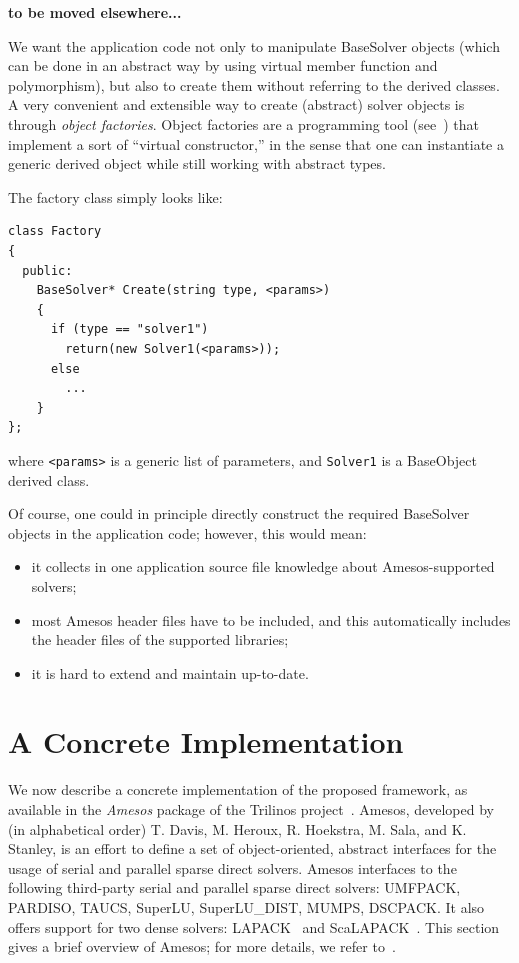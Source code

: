 \documentclass[acmtocl]{acmtrans2m}
\begin{document}
{\bf to be moved elsewhere...}

We want the application  code not only to manipulate BaseSolver objects 
(which can be done in an abstract way by using virtual member function and
 polymorphism), but also to create them without referring to the derived
classes. 
A very convenient and extensible way to create (abstract) solver objects is
through {\sl object factories}. Object factories are a programming
tool (see~\cite{alexandrescu04modern}) that implement a sort of ``virtual
constructor,'' in the sense that one can instantiate a generic derived object
while still working with abstract types.

The factory class simply looks like:
\begin{verbatim}
class Factory
{
  public:
    BaseSolver* Create(string type, <params>)
    {
      if (type == "solver1")
        return(new Solver1(<params>));
      else 
        ...
    }
};
\end{verbatim}
where \verb!<params>! is a generic list of parameters, and \verb!Solver1! is a
BaseObject derived class. 

Of course, one could in principle directly construct the required BaseSolver
objects in the application code; however, this would mean:
\begin{itemize}
\item it collects in one application source file knowledge about
Amesos-supported solvers;
\item most Amesos header files have to be included, and this automatically
includes the header files of the supported libraries;
\item it is hard to extend and maintain up-to-date.
\end{itemize}



\section{A Concrete Implementation}
\label{sec:concrete}

We now describe a concrete implementation of the proposed framework, as
available in the {\sl Amesos} package of the Trilinos
project~\cite{heroux05trilinos,trilinos-home-page}.
Amesos, developed by (in alphabetical order) T. Davis,
M. Heroux, R. Hoekstra, M. Sala, and K. Stanley, is an effort to define a set
of object-oriented, abstract interfaces for the usage of serial and
parallel sparse direct solvers. 
Amesos interfaces to the following third-party serial and parallel sparse
direct solvers: UMFPACK, PARDISO, TAUCS, SuperLU, SuperLU\_DIST, MUMPS,
DSCPACK. It also offers support for two dense solvers:
LAPACK~\cite{lapack-guide} and
ScaLAPACK~\cite{scalapack-guide}.
This section gives a brief overview of Amesos; for more details, we
refer to~\cite{Amesos-Reference-Guide}.
\end{document}
